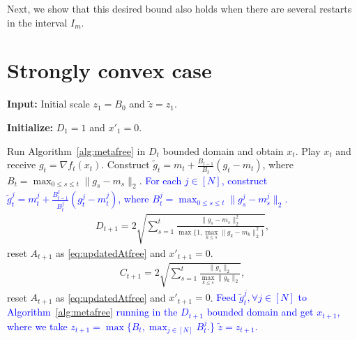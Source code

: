 \documentclass{article}
\theoremstyle{plain}
\theoremstyle{definition}
\theoremstyle{remark}
\newcommand{\bcomment}[1]{\textcolor{blue}{#1}}
\renewcommand{\tilde}{\widetilde}
\begin{document}
Next, we show that this desired bound also holds when there are several restarts in the interval $I_m$.



\section{Strongly convex case}
\begin{algorithm}[h]
\caption{Parameter free algorithms with unknown $D$ and $G$}

    \textbf{Input:} Initial scale $z_1=B_0$ and $\tilde{z}=z_1$.

    \textbf{Initialize:} $D_1=1$ and $x'_1=0$.
    
    \begin{algorithmic}[1]
        \STATE Run Algorithm~\ref{alg:metafree} in $D_t$ bounded domain and obtain $x_t$. Play $x_t$ and receive $g_t=\nabla f_t(x_t)$.
        \STATE Construct $\tilde{g}_t=m_t+\frac{B_{t-1}}{B_t}(g_t-m_t)$, where $B_t=\max_{0\leq s\leq t}\|g_s-m_s\|_2$.
        \STATE \bcomment{For each $j\in[N]$, construct $\tilde{g}_t^j=m_t^j+\frac{B_{t-1}^j}{B_t^j}(g_t^j-m_t^j)$, where $B_t^j=\max_{0\leq s\leq t}\|g_s^j-m_s^j\|_2$.}
            \STATE \begin{align*}
             D_{t+1} = 2 \sqrt{ \sum_{s=1}^t \frac{\| g_s - m_s \|_2^2}{ \max\{1, \max_{k \leq s} \| g_k - m_k \|_2^2 \} } },
            \end{align*}
        reset $A_{t+1}$ as \eqref{eq:updatedAtfree} and $x'_{t+1}=0$.
        \ENDIF
        \STATE\begin{align*}
            C_{t+1} = 2\sqrt{\sum_{s=1}^t\frac{\|g_s \|_2}{\max_{k \leq s} \| g_k \|_2 }},
        \end{align*}
        reset $A_{t+1}$ as \eqref{eq:updatedAtfree} and $x'_{t+1}=0$.
        \ENDIF
        \STATE \bcomment{Feed $\tilde{g}_t^j,\forall j\in[N]$ to Algorithm~\ref{alg:metafree} running in the $D_{t+1}$ bounded domain and get $x_{t+1}$, where we take $z_{t+1} = \max\{B_t,\max_{j\in [N]} B_t^j $.\}}
        \STATE\bcomment{\IF {$z_{t+1}/\tilde{z}>T$}
        \STATE $\tilde{z}=z_{t+1}.$
        \ENDIF
        }

        
    \ENDFOR
\end{algorithmic}
\end{algorithm}
\end{document}
